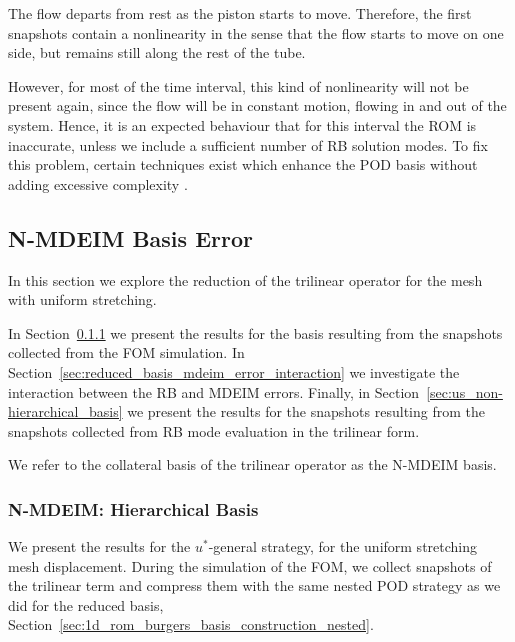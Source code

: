 \documentclass[../../thesis.tex]{subfiles}
\begin{document}
The flow departs from rest as the piston starts to move.
Therefore, the first snapshots contain a nonlinearity in the sense that the flow starts to move on one side, 
but remains still along the rest of the tube.

However, for most of the time interval, this kind of nonlinearity will not be present again,
since the flow will be in constant motion, flowing in and out of the system.
Hence, it is an expected behaviour that for this interval the ROM is inaccurate,
unless we include a sufficient number of RB solution modes.
To fix this problem, certain techniques exist which enhance the POD basis 
without adding excessive complexity \cite{weightedPOD}.

\newpage
\subsection{N-MDEIM Basis Error}
\label{sec:uniform_mdeim_errors}
In this section we explore the reduction of the trilinear operator
for the mesh with uniform stretching.

In Section~\ref{sec:us_hierarchical_basis} we present the results for
the basis resulting from the snapshots collected from the FOM simulation.
In Section~\ref{sec:reduced_basis_mdeim_error_interaction} we investigate
the interaction between the RB and MDEIM errors.
Finally, in Section~\ref{sec:us_non-hierarchical_basis} we present the results for
the snapshots resulting from the snapshots collected from RB mode evaluation
in the trilinear form.

We refer to the collateral basis of the trilinear operator as the N-MDEIM basis.

\subsubsection{N-MDEIM: Hierarchical Basis}
\label{sec:us_hierarchical_basis}
We present the results for the \mbox{$u^{*}$-general} strategy,
for the uniform stretching mesh displacement.
During the simulation of the FOM, 
we collect snapshots of the trilinear term and compress them with the same  
nested POD strategy as we did for the reduced basis, 
Section~\ref{sec:1d_rom_burgers_basis_construction_nested}.
\end{document}
